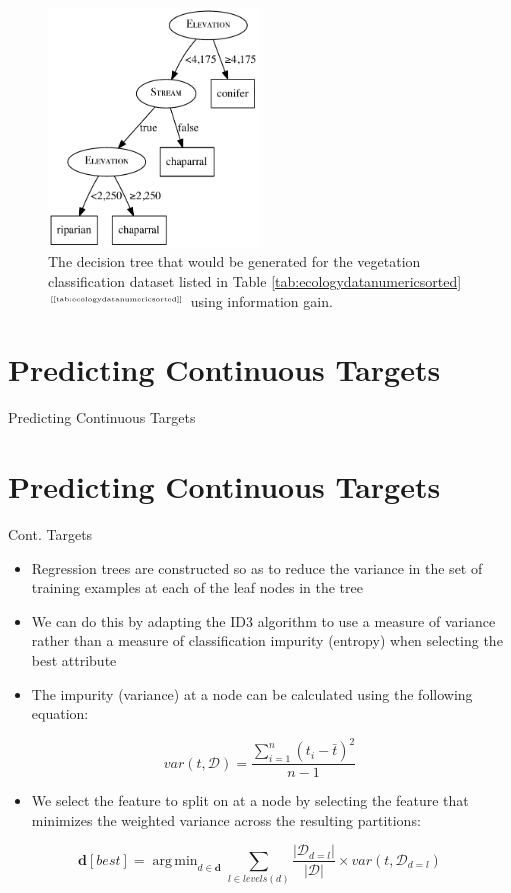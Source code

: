 \documentclass[xcolor={table}]{beamer}
\newcommand{\defn}[1]{\textcolor{myblue}{#1}}
\newcommand{\SectionSlideShortHeader}[3][]{
	\ifthenelse{\isempty{#1}}
		{\section[#3]{#2}\begin{frame} \begin{center}\begin{huge}#2\end{huge}\end{center}\end{frame}}
		{\section[#1]{#2}\begin{frame} \begin{center}\begin{huge}#3\end{huge}\end{center}\end{frame}}
}
\DeclareMathOperator*{\argmin}{arg\,min}
\newcommand{\ourRef}[1]{\ref{#1}$^{\text{\tiny[\pageref{#1}]}}$}
\begin{document}
 \begin{frame} 
\begin{figure}
\centerline{
	\includegraphics[width=0.5\textwidth]{./images/ex-hand-ecology-dectree7_mod.pdf}
}
\caption{The decision tree that would be generated for the vegetation classification dataset listed in Table \ourRef{tab:ecologydatanumericsorted} using information gain.}
\label{fig:ex-hand-dectree7}
\end{figure}
\end{frame} 


\SectionSlideShortHeader{Predicting Continuous Targets}{Cont. Targets}

\begin{frame}
		\begin{itemize}
\item Regression trees are constructed so as to reduce the \defn{variance} in the set of training examples at each of the leaf nodes in the tree
\item We can do this by adapting the ID3 algorithm to use a measure of variance rather than a measure of classification impurity (entropy) when selecting the best attribute
		\end{itemize}
\end{frame}

 \begin{frame} 
		\begin{itemize}
		\item The impurity (variance) at a node can be calculated using the following equation:
		\end{itemize}
\begin{equation}
var\left(t, \mathcal{D}\right) = \frac{\sum_{i=1}^n \left( t_i - \bar{t}\right)^2}{n-1}
\label{eq:decvariance}
\end{equation}
		\begin{itemize}
		\item We select the feature to split on at a node by selecting the feature that minimizes the weighted variance across the resulting partitions:
		\end{itemize}
\begin{equation}
\mathbf{d}[best] = \argmin_{d \in \mathbf{d}} \sum_{l \in levels(d)} \frac{|\mathcal{D}_{d=l}|}{|\mathcal{D}|} \times var(t, \mathcal{D}_{d=l})
\label{eq:dbestselection}
\end{equation}
\end{frame} 
\end{document}
